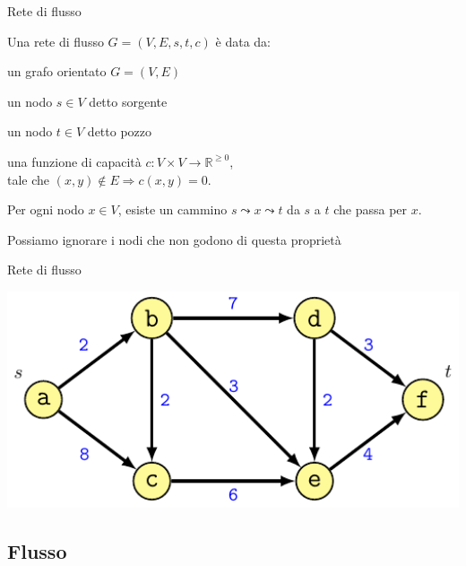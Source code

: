 \begin{frame}{Rete di flusso}

\vspace{-9pt}
\begin{myboxtitle}[Definizione]
Una \alert{rete di flusso $G=(V,E,s,t,c)$} è data da:
\BI
\item un grafo orientato $G=(V,E)$
\item un nodo $s \in V$ detto \alert{sorgente}
\item un nodo $t \in V$ detto \alert{pozzo}
\item una funzione di \alert{capacità} $c: V \times V \rightarrow \mathbb{R}^{\geq 0}$,\\
tale che $(x,y) \not \in E \Rightarrow c(x,y)=0$.
\EI
\end{myboxtitle}

\begin{myboxtitle}[Assunzioni]
\BIL
\item Per ogni nodo $x \in V$, esiste un cammino $s \leadsto x \leadsto t$ 
da $s$ a $t$ che passa per $x$.
\item Possiamo ignorare i nodi che non godono di questa proprietà
\EIL
\end{myboxtitle}

\end{frame}

\begin{frame}{Rete di flusso}

\includegraphics[width=1.0\textwidth]{template.pdf}

\end{frame}






\subsection{Flusso}


